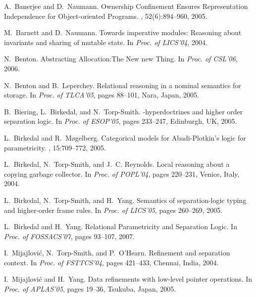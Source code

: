\documentclass{LMCS}
\begin{document}
\begin{thebibliography}{10}

A.~Banerjee and D.~Naumann.
\newblock Ownership Confinement Ensures Representation Independence for Object-oriented Programs.
, 52(6):894--960, 2005.

M.~Barnett and D.~Naumann.
\newblock Towards imperative modules: Reasoning about invariants and sharing of
  mutable state.
\newblock In {\em Proc. of LICS'04}, 2004.

N.~Benton.
\newblock Abstracting {A}llocation:{T}he {N}ew new {T}hing.
\newblock In {\em Proc. of CSL'06}, 2006.

N.~Benton and B.~Leperchey.
\newblock Relational reasoning in a nominal semantics for storage.
\newblock In {\em Proc. of TLCA'05}, pages 88--101, Nara, Japan, 2005.

B.~Biering, L.~Birkedal, and N.~Torp-Smith.
-hyperdoctrines and higher order separation logic.
\newblock In {\em Proc. of ESOP'05}, pages 233--247, Edinburgh, UK, 2005.

L.~Birkedal and R.~M{\o}gelberg.
\newblock Categorical models for {A}badi-{P}lotkin's logic for parametricity.
, 15:709--772, 2005.

L.~Birkedal, N.~Torp-Smith, and J.~C. Reynolds.
\newblock Local reasoning about a copying garbage collector.
\newblock In {\em Proc. of POPL'04}, pages 220--231, Venice, Italy, 2004.

L.~Birkedal, N.~Torp-Smith, and H.~Yang.
\newblock Semantics of separation-logic typing and higher-order frame rules.
\newblock In {\em Proc. of LICS'05}, pages 260--269, 2005.

L.~Birkedal and H.~Yang.
\newblock Relational Parametricity and Separation Logic.
\newblock In {\em Proc. of FOSSACS'07}, pages 93--107, 2007.

I.~Mijajlovi\'c, N.~Torp-Smith, and P.~O'Hearn.
\newblock Refinement and separation context.
\newblock In {\em Proc. of FSTTCS'04}, pages 421--433, Chennai, India, 2004.

I.~Mijajlovi\'c and H.~Yang.
\newblock Data refinements with low-level pointer operations.
\newblock In {\em Proc. of APLAS'05}, pages 19--36, Tsukuba, Japan, 2005.


\end{thebibliography}
\end{document}
